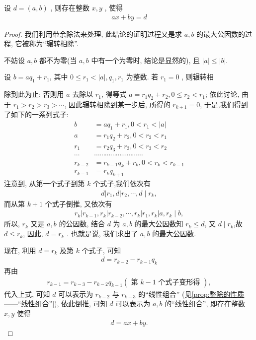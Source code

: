 \begin{property}[贝祖(Bezout)定理]
	设 $d=(a, b)$ , 则存在整数 $x ,  y$ , 使得
	\begin{align*}
		a x+b y=d
	\end{align*}
\end{property}
\begin{proof}
	我们利用带余除法来处理, 此结论的证明过程又是求 $a ,  b$ 的最大公因数的过程, 它被称为“辗转相除”.

	不妨设 $a ,  b$ 都不为零(当 $a ,  b$ 中有一个为零时, 结论是显然的), 且 $|a| \leqslant|b|$.

	设 $b=a q_{1}+r_{1}$, 其中 $0 \leqslant r_{1}<|a|, q_{1} ,  r_{1}$ 为整数. 若 $r_{1}=0$ , 则辗转相

	除到此为止; 否则用 $a$ 去除以 $r_{1}$, 得等式 $a=r_{1} q_{2}+r_{2}, 0 \leqslant r_{2}<r_{1}$; 依此讨论, 由于 $r_{1}>r_{2}>r_{3}>\cdots$, 因此辗转相除到某一步后, 所得的 $r_{k+1}=0$, 于是,我们得到了如下的一系列式子:
	\begin{align*}
		b       & =a q_{1}+r_{1}, 0<r_{1}<|a|                                    \\
		a       & =r_{1} q_{2}+r_{2}, 0<r_{2}<r_{1}                              \\
		r_{1}   & =r_{2} q_{3}+r_{3}, 0<r_{3}<r_{2}                              \\
		\cdots  & \cdots \cdots \cdots \cdots \cdots \cdots \cdots \cdots \cdots \\
		r_{k-2} & =r_{k-1} q_{k}+r_{k}, 0<r_{k}<r_{k-1}                          \\
		r_{k-1} & =r_{k} q_{k+1}
	\end{align*}
	注意到, 从第一个式子到第 $k$ 个式子,我们依次有
	\begin{align*}
		d\left|r_{1}, d\right| r_{2}, \cdots, d \mid r_{k},
	\end{align*}
	而从第 $k+1$ 个式子倒推, 又依次有
	\begin{align*}
		r_{k}\left|r_{k-1}, r_{k}\right| r_{k-2}, \cdots, r_{k}\left|r_{1}, r_{k}\right| a, r_{k} \mid b,
	\end{align*}
	所以, $r_{k}$ 又是 $a ,  b$ 的公因数, 结合 $d$ 为 $a ,  b$ 的最大公因数知 $r_{k} \leqslant d$, 又 $d \mid r_{k}$,故 $d \leqslant r_{k}$, 因此, $d=r_{k}$ . 也就是说, 我们求出了 $a ,  b$ 的最大公因数.

	现在, 利用 $d=r_{k}$ 及第 $k$ 个式子, 可知
	\begin{align*}
		d=r_{k-2}-r_{k-1} q_{k}
	\end{align*}
	再由
	\begin{align*}
		r_{k-1}=r_{k-3}-r_{k-2} q_{k-1}(\text { 第 } k-1 \text { 个式子变形得 }),
	\end{align*}
	代入上式, 可知 $d$ 可以表示为 $r_{k-2}$ 与 $r_{k-3}$ 的“线性组合” (见\autoref{prop:整除的性质——“线性组合”}), 依此倒推, 可知 $d$ 可以表示为 $a, b$ 的“线性组合”, 即存在整数 $x, y$ 使得
	\begin{align*}
		d=a x+b y .
	\end{align*}
\end{proof}
